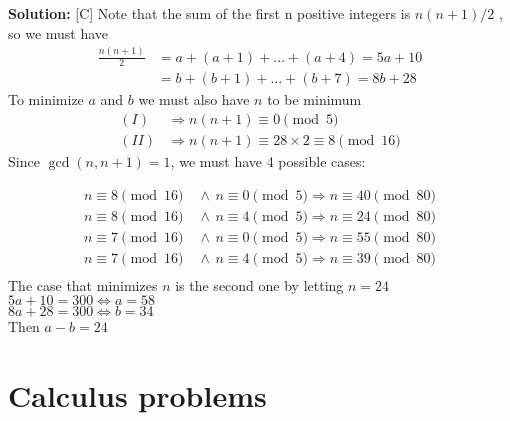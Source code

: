 \documentclass[12pt]{article}
\newcounter{problem}
\newenvironment{solution}{%
    \vspace{1em}
    \noindent\textbf{Solution:} 
}{}
\begin{document}
\begin{solution}[C]
   Note that the sum of the first n positive integers is $n(n+1)/2$ , so we must have
    \begin{align}
        \frac{n(n+1)}{2} &= a+(a+1)+\ldots+(a+4) = 5a+10 \tag{I} \label{eq:1}\\
        &= b+(b+1)+\ldots+(b+7) = 8b+28 \tag{II} \label{eq:1}
    \end{align}
    To minimize $a$ and $b$ we must also have $n$ to be minimum 
    \begin{align*}
        (I) &\Rightarrow n(n+1) \equiv 0 \pmod5 \\
        (II) &\Rightarrow n(n+1) \equiv 28 \times 2 \equiv 8 \pmod{16}
    \end{align*}
    Since $\gcd(n,n+1) = 1$, we must have 4 possible cases:
    
    \begin{align*}
        n \equiv 8 \pmod{16} \hspace{5pt} &\land \hspace{5pt} n \equiv 0 \pmod5 \Rightarrow n \equiv 40 \pmod{80} \\
        n \equiv 8 \pmod{16} \hspace{5pt} &\land \hspace{5pt} n \equiv 4 \pmod5 \Rightarrow n \equiv 24 \pmod{80} \\
        n \equiv 7 \pmod{16} \hspace{5pt} &\land \hspace{5pt} n \equiv 0 \pmod5 \Rightarrow n \equiv 55 \pmod{80} \\
        n \equiv 7 \pmod{16} \hspace{5pt} &\land \hspace{5pt} n \equiv 4 \pmod5 \Rightarrow n \equiv 39 \pmod{80} \\
    \end{align*}
    The case that minimizes $n$ is the second one by letting $n=24$ \\
    $5a+10=300 \iff a=58$ \\
    $8a+28=300 \iff b=34$ \\
    Then $a-b=\boxed{24}$ 
\end{solution}

\newpage

\section*{Calculus problems}
\end{document}
